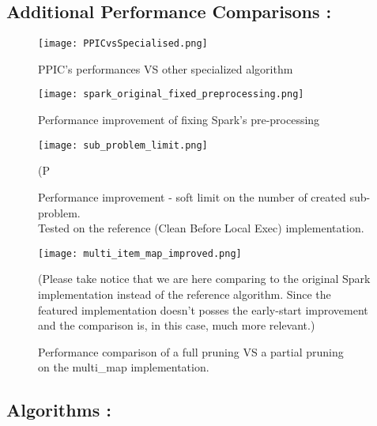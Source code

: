 \documentclass{eplmastersthesis}
\begin{document}
\subsection{Additional Performance Comparisons :}

\begin{figure}[h]
  \centering
  \texttt{[image: PPICvsSpecialised.png]}
  \caption{PPIC's performances VS other specialized algorithm}
  \label{fig:PPICvsOther}
\end{figure}

\begin{figure}[h]
  \centering
  \texttt{[image: spark\_original\_fixed\_preprocessing.png]}
  \caption{Performance improvement of fixing Spark's pre-processing}
  \label{fig:spark_preprocessing_fix}
\end{figure}

\begin{figure}[h]
  \centering
  \texttt{[image: sub\_problem\_limit.png]}
  \caption[Performance improvement - soft limit on the number of created sub-problem.]{
  		Performance improvement - soft limit on the number of created sub-problem. \\ 
  		Tested on the reference (Clean Before Local Exec) implementation.
  	\endtabular
  }
  (P
  \label{fig:sub_problem_limit}
\end{figure}

\begin{figure}[h]
  \centering
  \texttt{[image: multi\_item\_map\_improved.png]}
  \caption[PPIC with a map structure]{
  		Performance comparison of a full pruning VS a partial pruning \\ 
  		on the \textrm{multi\_map} implementation.
  	\endtabular
  }
  (Please take notice that we are here comparing to the original Spark implementation instead of the reference algorithm. Since the featured implementation doesn't posses the early-start improvement and the comparison is, in this case, much more relevant.)
  \label{fig:multi_map_comp}
\end{figure}

\clearpage
\subsection{Algorithms :}
\end{document}
